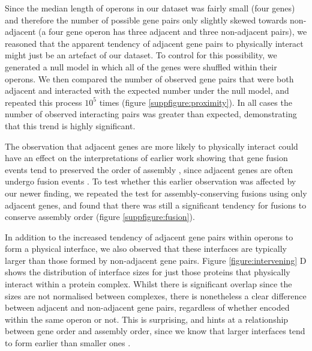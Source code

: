 \documentclass[a4paper,11pt,twoside,openright]{scrbook}
\begin{document}
Since the median length of operons in our dataset was fairly small (four genes) and therefore the number of possible gene pairs only slightly skewed towards non-adjacent (a four gene operon has three adjacent and three non-adjacent pairs), we reasoned that the apparent tendency of adjacent gene pairs to physically interact might just be an artefact of our dataset. To control for this possibility, we generated a null model in which all of the genes were shuffled within their operons. We then compared the number of observed gene pairs that were both adjacent and interacted with the expected number under the null model, and repeated this process \(10^{5}\) times (figure \ref{suppfigure:proximity}). In all cases the number of observed interacting pairs was greater than expected, demonstrating that this trend is highly significant.

The observation that adjacent genes are more likely to physically interact could have an effect on the interpretations of earlier work showing that gene fusion events tend to preserved the order of assembly \cite{Marsh2013}, since adjacent genes are often undergo fusion events \cite{Pasek2006}. To test whether this earlier observation was affected by our newer finding, we repeated the test for assembly-conserving fusions using only adjacent genes, and found that there was still a significant tendency for fusions to conserve assembly order (figure \ref{suppfigure:fusion}).

In addition to the increased tendency of adjacent gene pairs within operons to form a physical interface, we also observed that these interfaces are typically larger than those formed by non-adjacent gene pairs. Figure \ref{figure:intervening} D shows the distribution of interface sizes for just those proteins that physically interact within a protein complex. Whilst there is significant overlap since the sizes are not normalised between complexes, there is nonetheless a clear difference between adjacent and non-adjacent gene pairs, regardless of whether encoded within the same operon or not. This is surprising, and hints at a relationship between gene order and assembly order, since we know that larger interfaces tend to form earlier than smaller ones \cite{Levy2008,Marsh2013,Macek2017}.
\end{document}
